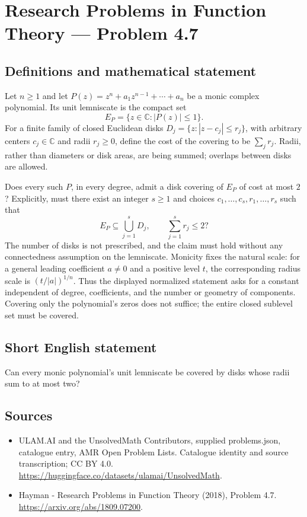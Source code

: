\documentclass[11pt,a4paper]{article}
\begin{document}
\section*{Research Problems in Function Theory — Problem 4.7}\label{statement}

\subsection{Definitions and mathematical statement}
Let $n\geq1$ and let
$P(z)=z^n+a_1z^{n-1}+\cdots+a_n$ be a monic complex polynomial.
Its unit lemniscate is the compact set
\[
 E_P=\{z\in\mathbb C:|P(z)|\leq1\}.
\]
For a finite family of closed Euclidean disks
$D_j=\{z:|z-c_j|\leq r_j\}$, with arbitrary centers $c_j\in\mathbb C$
and radii $r_j\geq0$, define the cost of the covering to be
$\sum_j r_j$. Radii, rather than diameters or disk areas, are being
summed; overlaps between disks are allowed.

Does every such $P$, in every degree, admit a disk covering of
$E_P$ of cost at most $2$? Explicitly, must there exist an integer
$s\geq1$ and choices $c_1,\ldots,c_s,r_1,\ldots,r_s$ such that
\[
 E_P\subseteq\bigcup_{j=1}^{s}D_j,
 \qquad \sum_{j=1}^{s}r_j\leq2?
\]
The number of disks is not prescribed, and the claim must hold
without any connectedness assumption on the lemniscate.
Monicity fixes the natural scale: for a general leading coefficient
$a\ne0$ and a positive level $t$, the corresponding radius scale is
$(t/|a|)^{1/n}$. Thus the displayed normalized statement asks for a
constant independent of degree, coefficients, and the number or
geometry of components. Covering only the polynomial's zeros does
not suffice; the entire closed sublevel set must be covered.
\subsection{Short English statement}
Can every monic polynomial's unit lemniscate be covered by disks whose radii sum to at most two?
\subsection{Sources}
\begin{itemize}
\item[S1] ULAM.AI and the UnsolvedMath Contributors, supplied problems.json, catalogue entry, AMR Open Problem Lists. Catalogue identity and source transcription; CC BY 4.0.
\url{https://huggingface.co/datasets/ulamai/UnsolvedMath}.
\item[S2] Hayman - Research Problems in Function Theory (2018), Problem 4.7. 
\url{https://arxiv.org/abs/1809.07200}.
\end{itemize}
\end{document}
